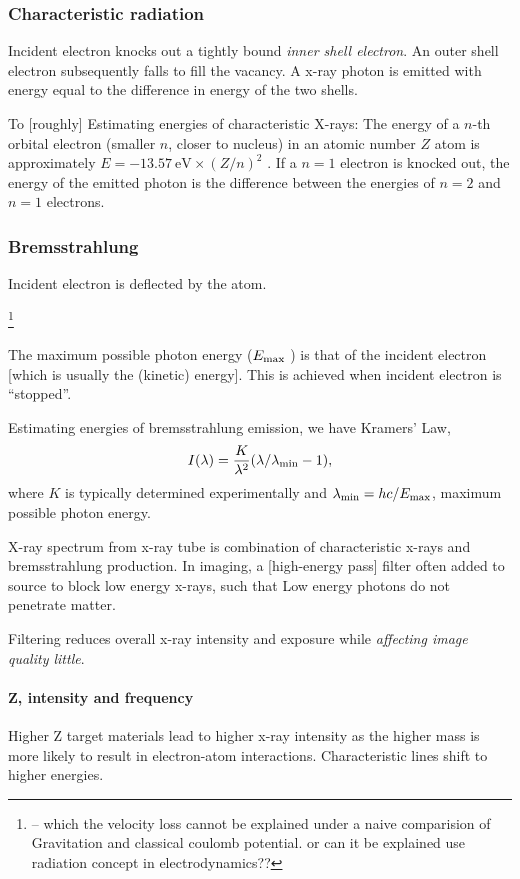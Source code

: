 \documentclass[UTF8,a4paper,11pt]{book}
\theoremstyle{mystyle}{
  \newtheorem{example}{Example}
}
\begin{document}
\subsubsection{Characteristic radiation}
 Incident electron knocks out a tightly bound \emph{inner
shell electron}. An outer shell electron subsequently falls to fill
the vacancy.  A x-ray photon is emitted with energy equal to the
difference in energy of the two shells.

To [roughly] Estimating energies of characteristic X-rays:
The energy of a $n$-th orbital electron (smaller $n$,
closer to nucleus) in an atomic number $Z$ atom is
approximately $E=\SI{-13.57}{\electronvolt}\times (Z/n)^2 $ .
If a $n = 1$ electron is knocked out, the energy of
the emitted photon is the difference between the
energies of $n = 2$ and $n = 1$ electrons.

\subsubsection{Bremsstrahlung}
 Incident electron is deflected by the atom.
 
\footnote{ -- which the velocity loss cannot be explained under
a naive comparision of Gravitation and classical coulomb potential. or can it be explained use radiation concept
in electrodynamics??}

The maximum possible photon energy ($E_{\rm max}$ ) is
that of the incident electron [which is usually the (kinetic) energy]. This is achieved
when incident electron is “stopped”.

Estimating energies of bremsstrahlung
emission, we have
 Kramers' Law, 
 \[I(\lambda) = \frac{K}{\lambda^2} (\lambda/\lambda_{\rm min} - 1),\]
  where $K$ is typically determined experimentally and
$\lambda_{\min}=hc/E_{\rm max}$, maximum possible photon energy.


X-ray spectrum from x-ray tube is combination
of characteristic x-rays and bremsstrahlung
production. In imaging, a [high-energy pass] filter often added to source to
block low energy x-rays, such that
 Low energy photons do not penetrate matter.
 
 Filtering reduces overall x-ray intensity and
exposure while \emph{affecting image quality little}.
 
 \paragraph{Z, intensity and frequency}
 Higher Z target materials lead to higher x-ray
intensity as the higher mass is more likely to
result in electron-atom interactions.
 Characteristic lines shift to higher energies.
\end{document}
